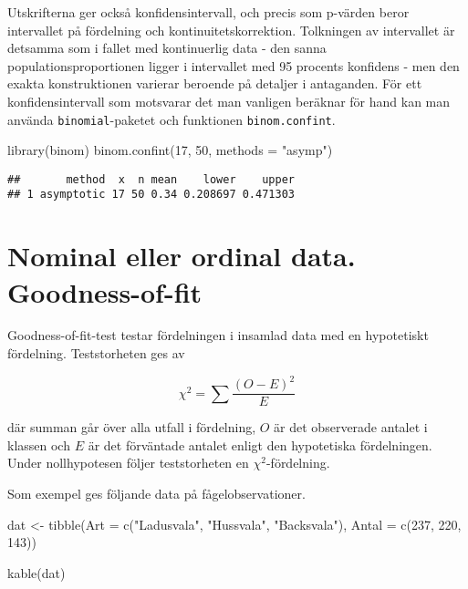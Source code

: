 \documentclass[
]{book}
\newenvironment{Shaded}{\begin{snugshade}}{\end{snugshade}}
\newcommand{\AttributeTok}[1]{\textcolor[rgb]{0.77,0.63,0.00}{#1}}
\newcommand{\DecValTok}[1]{\textcolor[rgb]{0.00,0.00,0.81}{#1}}
\newcommand{\FunctionTok}[1]{\textcolor[rgb]{0.00,0.00,0.00}{#1}}
\newcommand{\NormalTok}[1]{#1}
\newcommand{\OtherTok}[1]{\textcolor[rgb]{0.56,0.35,0.01}{#1}}
\newcommand{\StringTok}[1]{\textcolor[rgb]{0.31,0.60,0.02}{#1}}
\theoremstyle{definition}
\theoremstyle{definition}
\theoremstyle{definition}
\theoremstyle{definition}
\theoremstyle{remark}
\begin{document}
Utskrifterna ger också konfidensintervall, och precis som p-värden beror intervallet på fördelning och kontinuitetskorrektion. Tolkningen av intervallet är detsamma som i fallet med kontinuerlig data - den sanna populationsproportionen ligger i intervallet med 95 procents konfidens - men den exakta konstruktionen varierar beroende på detaljer i antaganden. För ett konfidensintervall som motsvarar det man vanligen beräknar för hand kan man använda \texttt{binomial}-paketet och funktionen \texttt{binom.confint}.

\begin{Shaded}
\begin{Highlighting}[]
\FunctionTok{library}\NormalTok{(binom)}
\FunctionTok{binom.confint}\NormalTok{(}\DecValTok{17}\NormalTok{, }\DecValTok{50}\NormalTok{, }\AttributeTok{methods =} \StringTok{"asymp"}\NormalTok{)}
\end{Highlighting}
\end{Shaded}

\begin{verbatim}
##       method  x  n mean    lower    upper
## 1 asymptotic 17 50 0.34 0.208697 0.471303
\end{verbatim}

\hypertarget{nominal-eller-ordinal-data.-goodness-of-fit}{%
\section{Nominal eller ordinal data. Goodness-of-fit}\label{nominal-eller-ordinal-data.-goodness-of-fit}}

Goodness-of-fit-test testar fördelningen i insamlad data med en hypotetiskt fördelning. Teststorheten ges av

\[\chi^2 = \sum \frac{(O-E)^2}{E}\]

där summan går över alla utfall i fördelning, \(O\) är det observerade antalet i klassen och \(E\) är det förväntade antalet enligt den hypotetiska fördelningen. Under nollhypotesen följer teststorheten en \(\chi^2\)-fördelning.

Som exempel ges följande data på fågelobservationer.

\begin{Shaded}
\begin{Highlighting}[]
\NormalTok{dat }\OtherTok{\textless{}{-}} \FunctionTok{tibble}\NormalTok{(}\AttributeTok{Art =} \FunctionTok{c}\NormalTok{(}\StringTok{"Ladusvala"}\NormalTok{, }\StringTok{"Hussvala"}\NormalTok{, }\StringTok{"Backsvala"}\NormalTok{),}
              \AttributeTok{Antal =} \FunctionTok{c}\NormalTok{(}\DecValTok{237}\NormalTok{, }\DecValTok{220}\NormalTok{, }\DecValTok{143}\NormalTok{))}

\FunctionTok{kable}\NormalTok{(dat)}
\end{Highlighting}
\end{Shaded}
\end{document}
